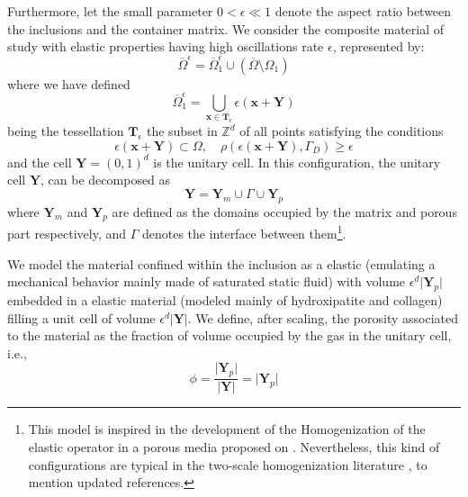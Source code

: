 Furthermore, let the small parameter $0 < \epsilon \ll 1$ denote the aspect ratio between the inclusions and the container matrix. 
We consider the composite material of study with elastic properties having high oscillations rate $\epsilon$, represented by:
\begin{equation*}
	\overline{\Omega}^{\epsilon} = \overline{\Omega}^{\epsilon}_1  \cup (\overline{\Omega}\setminus \Omega_1) 
\end{equation*}
where we have defined
\begin{equation*}
    \overline{\Omega}^{\epsilon}_1 = \bigcup_{\mathbf{x} \in \mathbf{T}_{\epsilon}} \epsilon ( \mathbf{x} + \mathbf{Y} )
\end{equation*}
being the tessellation $\mathbf{T}_{\epsilon}$ the subset in $\mathbb{Z}^d$ of all points satisfying the conditions
\begin{equation*}
    \epsilon (\mathbf{x} + \mathbf{Y}) \subset \Omega, \quad \rho(\epsilon(\mathbf{x}+\mathbf{Y}), \Gamma_D) \geq \epsilon
\end{equation*}
and the cell $\mathbf{Y} = (0, 1)^d$ is the unitary cell. 
In this configuration, the unitary cell $\mathbf{Y}$, can be decomposed as
\begin{equation*}
	\mathbf{Y} = \mathbf{Y}_m \cup \Gamma \cup \mathbf{Y}_p 
\end{equation*}
where $\mathbf{Y}_m$ and $\mathbf{Y}_p$ are defined as the domains occupied by the matrix and porous part respectively, and $\Gamma$ denotes the interface between them\footnote{This model is inspired in the development of the Homogenization of the elastic operator in a porous media proposed on \cite{christensen1982theory}. Nevertheless, this kind of configurations are typical in the two-scale homogenization literature \cite{panasenko2005multi-scale}, \cite{Boughammoura2013} to mention updated references.}.
\begin{rem}
We model the material confined within the inclusion as a elastic (emulating a mechanical behavior mainly made of saturated static fluid) with volume $\epsilon^d \vert \mathbf{Y}_p \vert$ embedded in a elastic material (modeled mainly of hydroxipatite and collagen) filling a unit cell of volume $\epsilon^d \vert \mathbf{Y} \vert$.
We define, after scaling, the porosity associated to the material as the fraction of volume occupied by the gas in the unitary cell, i.e., 
\begin{equation*}
\phi = \frac{\vert \mathbf{Y}_p \vert}{\vert \mathbf{Y} \vert} = \vert \mathbf{Y}_p \vert
\end{equation*}
\end{rem}


